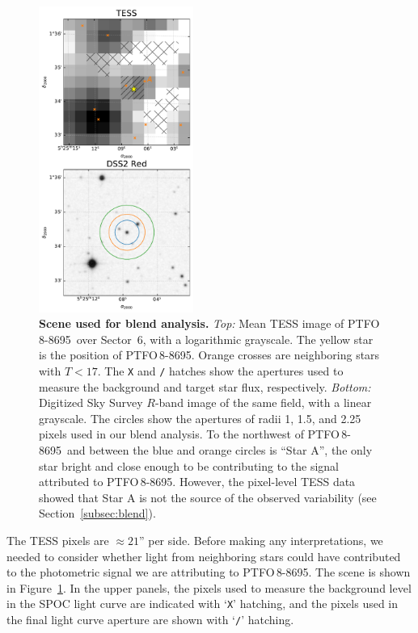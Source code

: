 \documentclass[12pt,twocolumn,tighten]{aastex62}
\newcommand{\ptfo}{PTFO$\,$8-8695}
\begin{document}
\begin{figure}[t]
	\begin{center}
		\leavevmode
		\includegraphics[width=0.45\textwidth]{f4.pdf}
	\end{center}
	\vspace{-0.7cm}
	\caption{ {\bf Scene used for blend analysis.}
    {\it Top:} Mean TESS image of \ptfo\ over Sector~6, with a
    logarithmic grayscale. The yellow star is the position of \ptfo.
    Orange crosses are neighboring stars with $T<17$. The \texttt{X}
    and \texttt{/} hatches show the apertures used to measure the
    background and target star flux, respectively.  {\it Bottom:}
    Digitized Sky Survey $R$-band image of the same field, with a
    linear grayscale. The circles show the apertures of radii 1, 1.5,
    and 2.25 pixels used in our blend analysis. To the northwest of
    \ptfo\ and between the blue and orange circles is ``Star A'', the
    only star bright and close enough to be contributing to the signal
    attributed to \ptfo. However, the pixel-level TESS data showed
    that Star A is not the source of the observed variability (see
    Section~\ref{subsec:blend}).
		\label{fig:scene}
	}
\end{figure}

The TESS pixels are $\approx21$'' per side. Before making any
interpretations, we needed to consider whether light from neighboring
stars could have contributed to the photometric signal we are
attributing to \ptfo. The scene is shown in Figure~\ref{fig:scene}.
In the upper panels, the pixels used to measure the background level
in the SPOC light curve are indicated with `\texttt{X}' hatching, and
the pixels used in the final light curve aperture are shown with
`\texttt{/}' hatching.
\end{document}
